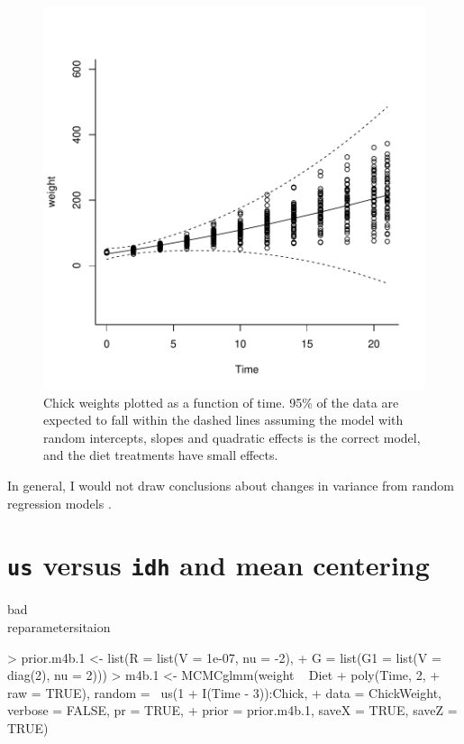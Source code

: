 \documentclass{article}
\begin{document}
\begin{figure}[!h]
\begin{center}
\includegraphics{Lecture4-040}
\end{center}
\caption{Chick weights plotted as a function of time. 95\% of the data are expected to fall within the dashed lines assuming the model with random intercepts, slopes and quadratic effects is the correct model, and the diet treatments have small effects.}
\label{VCVpred.3-fig}
\end{figure}

In general, I would not draw conclusions about changes in variance from random regression models \citep{Pletcher.1999a}.

\section{\texttt{us} versus \texttt{idh} and mean centering}
\label{RRcentering}
bad\\ 
reparametersitaion\\

\begin{Schunk}
\begin{Sinput}
> prior.m4b.1 <- list(R = list(V = 1e-07, nu = -2), 
+     G = list(G1 = list(V = diag(2), nu = 2)))
> m4b.1 <- MCMCglmm(weight ~ Diet + poly(Time, 2, 
+     raw = TRUE), random = ~us(1 + I(Time - 3)):Chick, 
+     data = ChickWeight, verbose = FALSE, pr = TRUE, 
+     prior = prior.m4b.1, saveX = TRUE, saveZ = TRUE)
\end{Sinput}
\end{Schunk}
\end{document}
